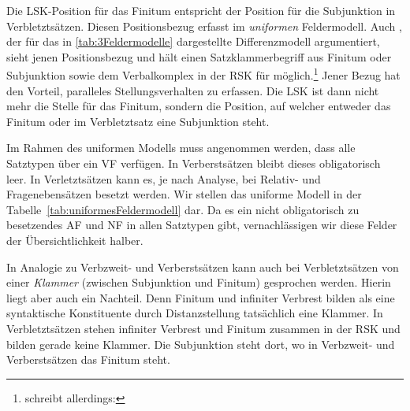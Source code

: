 Die LSK-Position für das Finitum entspricht der Position für die Subjunktion in Verbletztsätzen. Diesen Positionsbezug erfasst \citet[26, 33]{Woellstein2014} im \textit{uniformen} Feldermodell. Auch \citet[289]{Hoehle19862018}, der für das in \ref{tab:3Feldermodelle} dargestellte Differenzmodell argumentiert, sieht jenen Positionsbezug und hält einen Satzklammerbegriff aus Finitum oder Subjunktion sowie dem Verbalkomplex in der RSK für möglich.\footnote{\citet[289]{Hoehle19862018} schreibt allerdings: } Jener Bezug hat den Vorteil, paralleles Stellungsverhalten zu erfassen. Die LSK ist dann nicht mehr die Stelle für das Finitum, sondern die Position, auf welcher entweder das Finitum oder im Verbletztsatz eine Subjunktion steht. 

Im Rahmen des uniformen Modells muss angenommen werden, dass alle Satztypen über ein VF verfügen. In Verberstsätzen bleibt dieses obligatorisch leer. In Verletztsätzen kann es, je nach Analyse, bei Relativ- und Fragenebensätzen besetzt werden. Wir stellen das uniforme Modell in der Tabelle~\ref{tab:uniformesFeldermodell} dar. Da es ein nicht obligatorisch zu besetzendes AF und NF in allen Satztypen gibt, vernachlässigen wir diese Felder der Übersichtlichkeit halber.  

\begin{table}
  \centering
  \caption{Uniformes Feldermodell für die 3 Satztypen}
  \label{tab:uniformesFeldermodell}
\end{table}

In Analogie zu Verbzweit- und Verberstsätzen kann auch bei Verbletztsätzen von einer \textit{Klammer} (zwischen Subjunktion und Finitum) gesprochen werden. Hierin liegt aber auch ein Nachteil. Denn Finitum und infiniter Verbrest bilden als eine syntaktische Konstituente durch Distanzstellung tatsächlich eine Klammer. In Verbletztsätzen stehen infiniter Verbrest und Finitum zusammen in der RSK und bilden gerade keine Klammer. Die Subjunktion steht dort, wo in Verbzweit- und Verberstsätzen das Finitum steht. 

